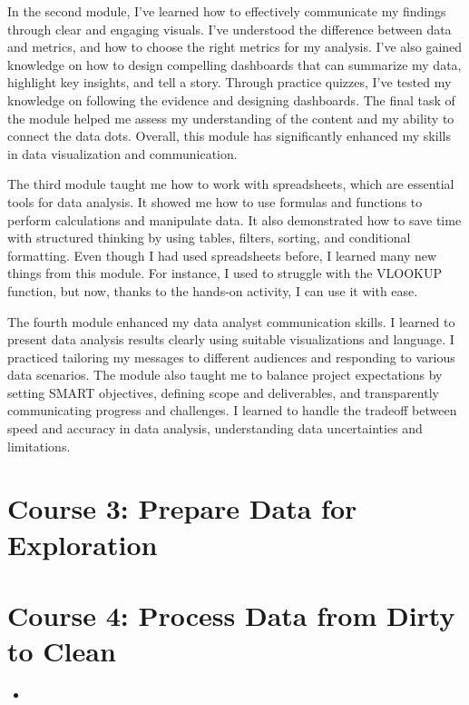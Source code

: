 \documentclass[]{article}
\begin{document}
In the second module, I've learned how to effectively communicate my findings through clear and engaging visuals. I've understood the difference between data and metrics, and how to choose the right metrics for my analysis. I've also gained knowledge on how to design compelling dashboards that can summarize my data, highlight key insights, and tell a story. Through practice quizzes, I've tested my knowledge on following the evidence and designing dashboards. The final task of the module helped me assess my understanding of the content and my ability to connect the data dots. Overall, this module has significantly enhanced my skills in data visualization and communication.\par

The third module taught me how to work with spreadsheets, which are essential tools for data analysis. It showed me how to use formulas and functions to perform calculations and manipulate data. It also demonstrated how to save time with structured thinking by using tables, filters, sorting, and conditional formatting. Even though I had used spreadsheets before, I learned many new things from this module. For instance, I used to struggle with the VLOOKUP function, but now, thanks to the hands-on activity, I can use it with ease.\par

The fourth module enhanced my data analyst communication skills. I learned to present data analysis results clearly using suitable visualizations and language. I practiced tailoring my messages to different audiences and responding to various data scenarios. The module also taught me to balance project expectations by setting SMART objectives, defining scope and deliverables, and transparently communicating progress and challenges. I learned to handle the tradeoff between speed and accuracy in data analysis, understanding data uncertainties and limitations.\par

\section{Course 3: Prepare Data for Exploration}


\section{Course 4: Process Data from Dirty to Clean}
\begin{itemize}
  \item
\end{itemize}
\end{document}
